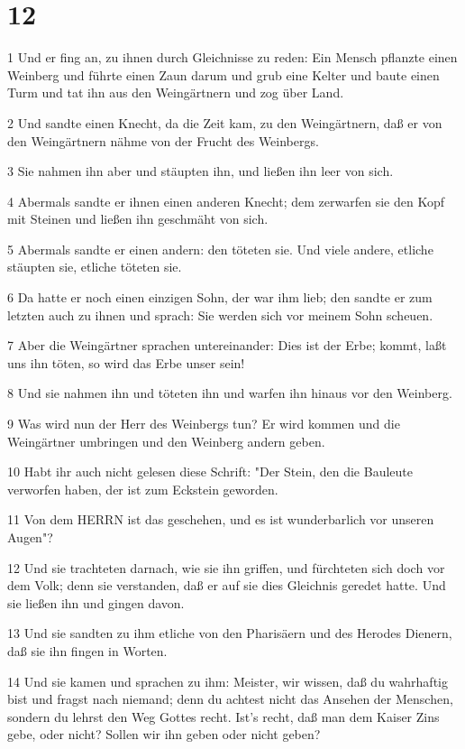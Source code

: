 \chapter{12}

\par 1 Und er fing an, zu ihnen durch Gleichnisse zu reden: Ein Mensch pflanzte einen Weinberg und führte einen Zaun darum und grub eine Kelter und baute einen Turm und tat ihn aus den Weingärtnern und zog über Land.
\par 2 Und sandte einen Knecht, da die Zeit kam, zu den Weingärtnern, daß er von den Weingärtnern nähme von der Frucht des Weinbergs.
\par 3 Sie nahmen ihn aber und stäupten ihn, und ließen ihn leer von sich.
\par 4 Abermals sandte er ihnen einen anderen Knecht; dem zerwarfen sie den Kopf mit Steinen und ließen ihn geschmäht von sich.
\par 5 Abermals sandte er einen andern: den töteten sie. Und viele andere, etliche stäupten sie, etliche töteten sie.
\par 6 Da hatte er noch einen einzigen Sohn, der war ihm lieb; den sandte er zum letzten auch zu ihnen und sprach: Sie werden sich vor meinem Sohn scheuen.
\par 7 Aber die Weingärtner sprachen untereinander: Dies ist der Erbe; kommt, laßt uns ihn töten, so wird das Erbe unser sein!
\par 8 Und sie nahmen ihn und töteten ihn und warfen ihn hinaus vor den Weinberg.
\par 9 Was wird nun der Herr des Weinbergs tun? Er wird kommen und die Weingärtner umbringen und den Weinberg andern geben.
\par 10 Habt ihr auch nicht gelesen diese Schrift: "Der Stein, den die Bauleute verworfen haben, der ist zum Eckstein geworden.
\par 11 Von dem HERRN ist das geschehen, und es ist wunderbarlich vor unseren Augen"?
\par 12 Und sie trachteten darnach, wie sie ihn griffen, und fürchteten sich doch vor dem Volk; denn sie verstanden, daß er auf sie dies Gleichnis geredet hatte. Und sie ließen ihn und gingen davon.
\par 13 Und sie sandten zu ihm etliche von den Pharisäern und des Herodes Dienern, daß sie ihn fingen in Worten.
\par 14 Und sie kamen und sprachen zu ihm: Meister, wir wissen, daß du wahrhaftig bist und fragst nach niemand; denn du achtest nicht das Ansehen der Menschen, sondern du lehrst den Weg Gottes recht. Ist's recht, daß man dem Kaiser Zins gebe, oder nicht? Sollen wir ihn geben oder nicht geben?
